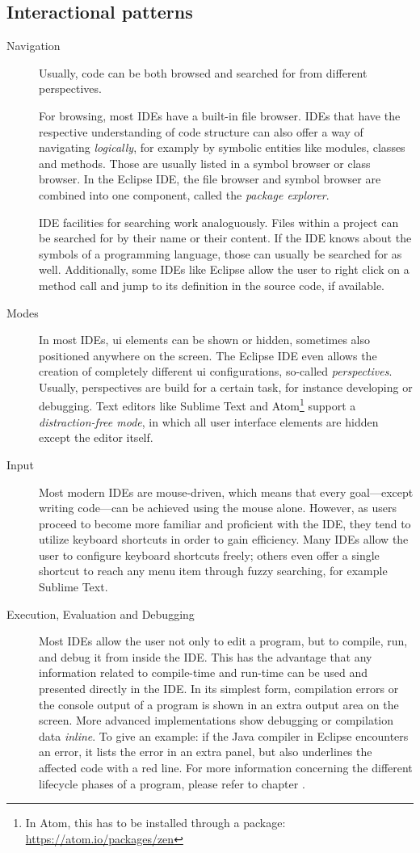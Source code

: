 \subsection{Interactional patterns}\label{interactional-patterns}

\begin{description}
\item[Navigation]
Usually, code can be both browsed and searched for from different
perspectives.

For browsing, most IDEs have a built-in file browser. IDEs that have the
respective understanding of code structure can also offer a way of
navigating \emph{logically}, for examply by symbolic entities like
modules, classes and methods. Those are usually listed in a symbol
browser or class browser. In the Eclipse IDE, the file browser and
symbol browser are combined into one component, called the \emph{package
explorer}.

IDE facilities for searching work analoguously. Files within a project
can be searched for by their name or their content. If the IDE knows
about the symbols of a programming language, those can usually be
searched for as well. Additionally, some IDEs like Eclipse allow the
user to right click on a method call and jump to its definition in the
source code, if available.
\item[Modes]
In most IDEs, \ac{ui} elements can be shown or hidden, sometimes also
positioned anywhere on the screen. The Eclipse IDE even allows the
creation of completely different \ac{ui} configurations, so-called
\emph{perspectives}. Usually, perspectives are build for a certain task,
for instance developing or debugging. Text editors like Sublime Text and
Atom\footnote{In Atom, this has to be installed through a package: \url{https://atom.io/packages/zen}}
support a \emph{distraction-free mode}, in which all user interface
elements are hidden except the editor itself.
\item[Input]
Most modern IDEs are mouse-driven, which means that every goal—except
writing code—can be achieved using the mouse alone. However, as users
proceed to become more familiar and proficient with the IDE, they tend
to utilize keyboard shortcuts in order to gain efficiency. Many IDEs
allow the user to configure keyboard shortcuts freely; others even offer
a single shortcut to reach any menu item through fuzzy searching, for
example Sublime Text.
\item[Execution, Evaluation and Debugging]
Most IDEs allow the user not only to edit a program, but to compile,
run, and debug it from inside the IDE. This has the advantage that any
information related to compile-time and run-time can be used and
presented directly in the IDE. In its simplest form, compilation errors
or the console output of a program is shown in an extra output area on
the screen. More advanced implementations show debugging or compilation
data \emph{inline}. To give an example: if the Java compiler in Eclipse
encounters an error, it lists the error in an extra panel, but also
underlines the affected code with a red line. For more information
concerning the different lifecycle phases of a program, please refer to
chapter .
\end{description}

